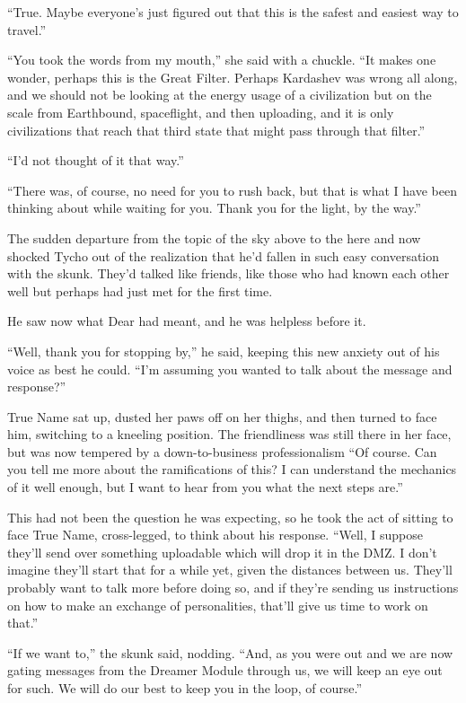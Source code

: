 ``True. Maybe everyone's just figured out that this is the safest and easiest way to travel.''

``You took the words from my mouth,'' she said with a chuckle. ``It makes one wonder, perhaps this is the Great Filter. Perhaps Kardashev was wrong all along, and we should not be looking at the energy usage of a civilization but on the scale from Earthbound, spaceflight, and then uploading, and it is only civilizations that reach that third state that might pass through that filter.''

``I'd not thought of it that way.''

``There was, of course, no need for you to rush back, but that is what I have been thinking about while waiting for you. Thank you for the light, by the way.''

The sudden departure from the topic of the sky above to the here and now shocked Tycho out of the realization that he'd fallen in such easy conversation with the skunk. They'd talked like friends, like those who had known each other well but perhaps had just met for the first time.

He saw now what Dear had meant, and he was helpless before it.

``Well, thank you for stopping by,'' he said, keeping this new anxiety out of his voice as best he could. ``I'm assuming you wanted to talk about the message and response?''

True Name sat up, dusted her paws off on her thighs, and then turned to face him, switching to a kneeling position. The friendliness was still there in her face, but was now tempered by a down-to-business professionalism ``Of course. Can you tell me more about the ramifications of this? I can understand the mechanics of it well enough, but I want to hear from you what the next steps are.''

This had not been the question he was expecting, so he took the act of sitting to face True Name, cross-legged, to think about his response. ``Well, I suppose they'll send over something uploadable which will drop it in the DMZ. I don't imagine they'll start that for a while yet, given the distances between us. They'll probably want to talk more before doing so, and if they're sending us instructions on how to make an exchange of personalities, that'll give us time to work on that.''

``If we want to,'' the skunk said, nodding. ``And, as you were out and we are now gating messages from the Dreamer Module through us, we will keep an eye out for such. We will do our best to keep you in the loop, of course.''

